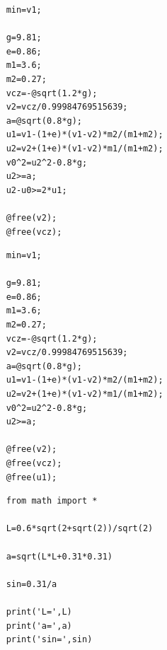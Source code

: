 \documentclass[UTF8]{article}
\begin{document}
\begin{appendices}
\centerline{}
 \begin{verbatim}
    min=v1;

    g=9.81;
    e=0.86;
    m1=3.6;
    m2=0.27;
    vcz=-@sqrt(1.2*g);
    v2=vcz/0.99984769515639;
    a=@sqrt(0.8*g);
    u1=v1-(1+e)*(v1-v2)*m2/(m1+m2);
    u2=v2+(1+e)*(v1-v2)*m1/(m1+m2);
    v0^2=u2^2-0.8*g;
    u2>=a;
    u2-u0>=2*u1;
    
    @free(v2);
    @free(vcz);
\end{verbatim}

\centerline{}
 \begin{verbatim}
    min=v1;

    g=9.81;
    e=0.86;
    m1=3.6;
    m2=0.27;
    vcz=-@sqrt(1.2*g);
    v2=vcz/0.99984769515639;
    a=@sqrt(0.8*g);
    u1=v1-(1+e)*(v1-v2)*m2/(m1+m2);
    u2=v2+(1+e)*(v1-v2)*m1/(m1+m2);
    v0^2=u2^2-0.8*g;
    u2>=a;
    
    @free(v2);
    @free(vcz);
    @free(u1);
\end{verbatim}

\centerline{}
 \begin{verbatim}
    from math import *

    L=0.6*sqrt(2+sqrt(2))/sqrt(2)
    
    a=sqrt(L*L+0.31*0.31)
    
    sin=0.31/a
    
    print('L=',L)
    print('a=',a)
    print('sin=',sin)
\end{verbatim}
\end{appendices}
\end{document}
